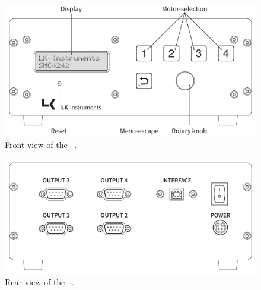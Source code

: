 \begin{figure}[h]
  \centering
  \includegraphics[angle=0,origin=c,width=1\textwidth]{./grafiken/MG22131_front_text_2.pdf}
  \caption[Front view of \productNumber .]{Front view of the \productNumber ~\productName .}
  \label{frontpanel}
\end{figure}

\begin{figure}[h]
  \centering
  \includegraphics[angle=0,origin=c,width=1\textwidth]{./grafiken/MG22131_back_text.pdf}
  \caption[Rear view of \productNumber .]{Rear view of the \productNumber ~\productName .}
  \label{frontpanel}
\end{figure}



